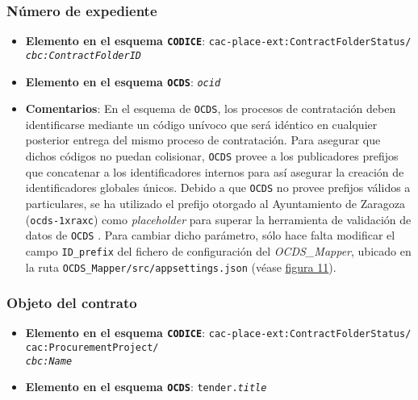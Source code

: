         \subsubsection{Número de expediente}
            \begin{itemize}
                \item \textbf{Elemento en el esquema \texttt{CODICE}}:
                    \tabto{7.6cm} \texttt{cac-place-ext:ContractFolderStatus/} \\
                    \tabto{7.6cm} \texttt{\textit{cbc:ContractFolderID}}
                \item \textbf{Elemento en el esquema \texttt{OCDS}}:
                    \tabto{7.6cm} \texttt{\textit{ocid}}
                \item \textbf{Comentarios}: En el esquema de \texttt{OCDS}, los procesos de contratación deben identificarse mediante un código unívoco que será idéntico en cualquier posterior entrega del mismo proceso de contratación. Para asegurar que dichos códigos no puedan colisionar, \texttt{OCDS} provee a los publicadores prefijos que concatenar a los identificadores internos para así asegurar la creación de identificadores globales únicos. Debido a que \texttt{OCDS} no provee prefijos válidos a particulares, se ha utilizado el prefijo otorgado al Ayuntamiento de Zaragoza (\texttt{ocds-1xraxc}) como \textit{placeholder} para superar la herramienta de validación de datos de \texttt{OCDS} \cite{OCDSREVIEWTOOL}. Para cambiar dicho parámetro, sólo hace falta modificar el campo \texttt{ID\_prefix} del fichero de configuración del \textit{OCDS\_Mapper}, ubicado en la ruta \texttt{OCDS\_Mapper/src/appsettings.json} (véase \hyperref[fig:estructura]{figura 11}).
            \end{itemize}
        
        \subsubsection{Objeto del contrato}
            \begin{itemize}
                \item \textbf{Elemento en el esquema \texttt{CODICE}}:
                    \tabto{7.6cm} \texttt{cac-place-ext:ContractFolderStatus/} \\
                    \tabto{7.6cm} \texttt{cac:ProcurementProject/} \\
                    \tabto{7.6cm} \texttt{\textit{cbc:Name}}
                \item \textbf{Elemento en el esquema \texttt{OCDS}}:
                    \tabto{7.6cm} \texttt{tender.\textit{title}}
            \end{itemize}
        
